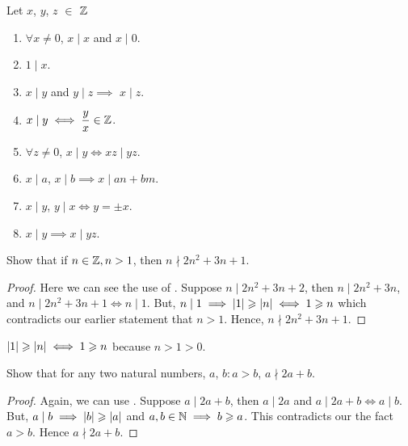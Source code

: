 
\begin{theorem}
    Let \(x\), \(y\), \(z\) \(\in\) \(\mathbb Z\)
    \begin{enumerate}
        \item \(\forall x \ne 0\), \(x \mid x\) and \(x \mid 0\).
        \item \(1 \mid x\).
        \item \(x\mid y\) and \(y \mid z \implies \) \(x \mid z\).
        \item \(x \mid y \iff \dfrac{y}{x} \in \mathbb Z\).
        \item \(\forall z \ne 0\), \(x \mid y \iff xz \mid yz\). 
        \item \(x\mid a\), \(x\mid b \implies x\mid an+bm\).
        \item \(x\mid y\), \(y\mid x \iff y=\pm x\).
        \item \(x \mid y \implies x \mid yz\).
        
    \end{enumerate}
    
\end{theorem}

\begin{example}
    Show that if \(n \in \mathbb Z, n > 1\), then \(n \nmid 2n^2 + 3n + 1\).
    \begin{proof}
        Here we can see the use of . Suppose \(n \mid 2n^2+3n+2\), then \(n \mid 2n^2 + 3n\), and \(n \mid 2n^2 + 3n + 1 \iff n \mid 1\). But, \( n \mid 1 \implies \abs{1} \geqslant \abs{n} \iff 1 \geqslant n\) which contradicts our earlier statement that \(n > 1\). Hence, \(n \nmid 2n^2+3n+1\).
    \end{proof}
\end{example}

\begin{remark}
    \( \abs{1} \geqslant \abs{n} \iff 1 \geqslant n\) because \(n>1>0\).
\end{remark}


\begin{example}
    Show that for any two natural numbers, \(a\), \(b : a > b\), \(a \nmid 2a+b\).
    \begin{proof}
        Again, we can use . Suppose \(a \mid 2a+b\), then \(a \mid 2a\) and \(a \mid 2a + b \iff a \mid b\). But, \(a \mid b \implies \abs{b} \geqslant \abs{a} \) and \(a, b \in \mathbb N \implies b \geqslant a \). This contradicts our the fact \(a > b\). Hence \(a \nmid 2a+b\).
    \end{proof}
\end{example}


